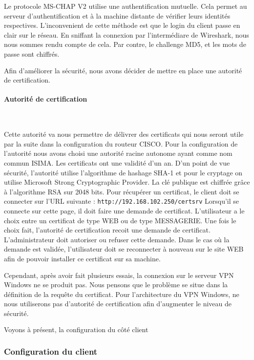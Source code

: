 Le protocole MS-CHAP V2 utilise une authentification mutuelle. Cela permet au serveur d'authentification et à la machine distante de vérifier leurs identités respectives. L'inconvenient de cette méthode est que le login du client passe en clair sur le réseau. En sniffant la connexion par l'intermédiare de Wireshark, nous nous sommes rendu compte de cela. Par contre, le challenge MD5, et les mots de passe sont chiffrés.



Afin d'améliorer la sécurité, nous avons décider de mettre en place une autorité de certification.

\paragraph{Autorité de certification}
~


Cette autorité va nous permettre de délivrer des certificats qui nous seront utile par la suite dans la configuration du routeur CISCO. Pour la configuration de l'autorité nous avons choisi une autorité racine autonome ayant comme nom commun ISIMA. Les certificats ont une validité d'un an. D'un point de vue sécurité, l'autorité utilise l'algorithme de hashage SHA-1 et pour le cryptage on utilise Microsoft Strong Cryptographic Provider. La clé publique est chiffrée grâce à l'algorithme RSA sur 2048 bits.
Pour récupérer un certificat, le client doit se connecter sur l'URL suivante : \verb|http://192.168.102.250/certsrv|
Lorsqu'il se connecte sur cette page, il doit faire une demande de certificat. L'utilisateur a le choix entre un certificat de type WEB ou de type MESSAGERIE. Une fois le choix fait, l'autorité de certification recoit une demande de certificat. L'administrateur doit autoriser ou refuser cette demande. Dans le cas où la demande est validée, l'utilisateur doit se reconnecter à nouveau sur le site WEB afin de pouvoir installer ce certificat sur sa machine.

Cependant, après avoir fait plusieurs essais, la connexion sur le serveur VPN Windows ne se produit pas. Nous pensons que le problème se situe dans la définition de la requête du certificat. Pour l'architecture du VPN Windows, ne nous utiliserons pas d'autorité de certification afin d'augmenter le niveau de sécurité. 

Voyons à présent, la configuration du côté client

\subsubsection{Configuration du client}
~


